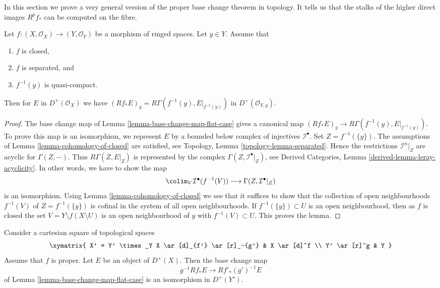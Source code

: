 \noindent
In this section we prove a very general version of the proper base change
theorem in topology. It tells us that the stalks of the higher direct
images $R^pf_*$ can be computed on the fibre.

\begin{lemma}
\label{lemma-proper-base-change}
Let $f : (X, \mathcal{O}_X) \to (Y, \mathcal{O}_Y)$ be a morphism of
ringed spaces. Let $y \in Y$. Assume that
\begin{enumerate}
\item $f$ is closed,
\item $f$ is separated, and
\item $f^{-1}(y)$ is quasi-compact.
\end{enumerate}
Then for $E$ in $D^+(\mathcal{O}_X)$
we have $(Rf_*E)_y = R\Gamma(f^{-1}(y), E|_{f^{-1}(y)})$ in
$D^+(\mathcal{O}_{Y, y})$.
\end{lemma}

\begin{proof}
The base change map of Lemma \ref{lemma-base-change-map-flat-case}
gives a canonical map $(Rf_*E)_y \to R\Gamma(f^{-1}(y), E|_{f^{-1}(y)})$.
To prove this map is an isomorphism, we represent $E$ by a bounded
below complex of injectives $\mathcal{I}^\bullet$.
Set $Z = f^{-1}(\{y\})$. The assumptions of
Lemma \ref{lemma-cohomology-of-closed}
are satisfied, see Topology, Lemma \ref{topology-lemma-separated}.
Hence the restrictions
$\mathcal{I}^n|_Z$ are acyclic for $\Gamma(Z, -)$.
Thus $R\Gamma(Z, E|_Z)$ is represented by the
complex $\Gamma(Z, \mathcal{I}^\bullet|_Z)$, see
Derived Categories, Lemma \ref{derived-lemma-leray-acyclicity}.
In other words, we have to show the map
$$
\colim_V \mathcal{I}^\bullet(f^{-1}(V))
\longrightarrow
\Gamma(Z, \mathcal{I}^\bullet|_Z)
$$
is an isomorphism. Using Lemma \ref{lemma-cohomology-of-closed}
we see that it suffices to show that the collection of open neighbourhoods
$f^{-1}(V)$ of $Z = f^{-1}(\{y\})$
is cofinal in the system of all open neighbourhoods.
If $f^{-1}(\{y\}) \subset U$ is an open neighbourhood, then as $f$ is closed
the set $V = Y \setminus f(X \setminus U)$ is an open neighbourhood
of $y$ with $f^{-1}(V) \subset U$. This proves the lemma.
\end{proof}

\begin{theorem}
\label{theorem-proper-base-change}
\begin{reference}
\cite[Expose V bis, 4.1.1]{SGA4}
\end{reference}
Consider a cartesian square of topological spaces
$$
\xymatrix{
X' = Y' \times_Y X \ar[d]_{f'} \ar[r]_-{g'} & X \ar[d]^f \\
Y' \ar[r]^g & Y
}
$$
Assume that $f$ is proper.
Let $E$ be an object of $D^+(X)$. Then the base change map
$$
g^{-1}Rf_*E \longrightarrow Rf'_*(g')^{-1}E
$$
of Lemma \ref{lemma-base-change-map-flat-case} is an isomorphism
in $D^+(Y')$.
\end{theorem}

